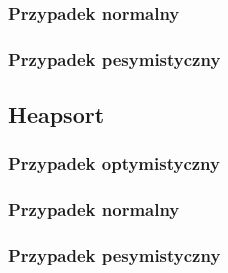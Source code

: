 \documentclass[12pt, polish]{article}
\begin{document}
\subsubsection{Przypadek normalny}

\begin{table}[htb]
    \centering
    \label{table:tablename}
	\quad
\end{table}

\subsubsection{Przypadek pesymistyczny}

\begin{table}[htb]
    \centering
    \label{table:tablename}
	\quad
\end{table}

\newpage
\subsection{Heapsort}

\subsubsection{Przypadek optymistyczny}

\begin{table}[htb]
    \centering
    \label{table:tablename}
	\quad
\end{table}

\subsubsection{Przypadek normalny}

\begin{table}[htb]
    \centering
    \label{table:tablename}
	\quad
\end{table}

\subsubsection{Przypadek pesymistyczny}

\begin{table}[htb]
    \centering
    \label{table:tablename}
	\quad
\end{table}
\end{document}
